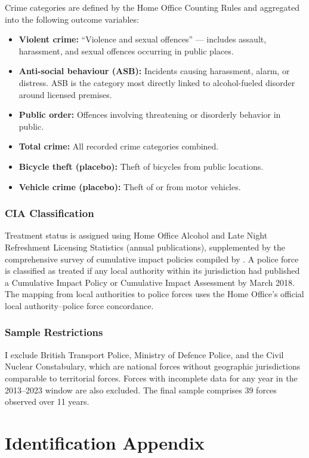 \documentclass[12pt]{article}
\begin{document}
Crime categories are defined by the Home Office Counting Rules and aggregated into the following outcome variables:
\begin{itemize}
    \item \textbf{Violent crime:} ``Violence and sexual offences'' --- includes assault, harassment, and sexual offences occurring in public places.
    \item \textbf{Anti-social behaviour (ASB):} Incidents causing harassment, alarm, or distress. ASB is the category most directly linked to alcohol-fueled disorder around licensed premises.
    \item \textbf{Public order:} Offences involving threatening or disorderly behavior in public.
    \item \textbf{Total crime:} All recorded crime categories combined.
    \item \textbf{Bicycle theft (placebo):} Theft of bicycles from public locations.
    \item \textbf{Vehicle crime (placebo):} Theft of or from motor vehicles.
\end{itemize}

\subsubsection*{CIA Classification} Treatment status is assigned using Home Office Alcohol and Late Night Refreshment Licensing Statistics (annual publications), supplemented by the comprehensive survey of cumulative impact policies compiled by \citet{grace2016cumulative}. A police force is classified as treated if any local authority within its jurisdiction had published a Cumulative Impact Policy or Cumulative Impact Assessment by March 2018. The mapping from local authorities to police forces uses the Home Office's official local authority--police force concordance.

\subsubsection*{Sample Restrictions} I exclude British Transport Police, Ministry of Defence Police, and the Civil Nuclear Constabulary, which are national forces without geographic jurisdictions comparable to territorial forces. Forces with incomplete data for any year in the 2013--2023 window are also excluded. The final sample comprises 39 forces observed over 11 years.

\section{Identification Appendix}
\label{app:identification}
\end{document}

